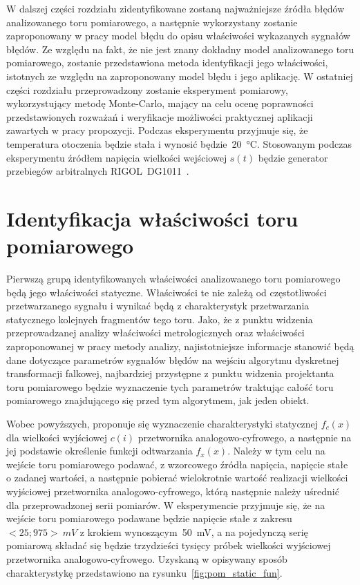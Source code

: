 W dalszej części rozdziału zidentyfikowane zostaną najważniejsze źródła błędów analizowanego toru pomiarowego, a następnie wykorzystany zostanie zaproponowany w pracy model błędu do opisu właściwości wykazanych sygnałów błędów. Ze względu na fakt, że nie jest znany dokładny model analizowanego toru pomiarowego, zostanie przedstawiona metoda identyfikacji jego właściwości, istotnych ze względu na zaproponowany model błędu i jego aplikację. W ostatniej części rozdziału przeprowadzony zostanie eksperyment pomiarowy, wykorzystujący metodę Monte-Carlo, mający na celu ocenę poprawności przedstawionych rozważań i weryfikacje możliwości praktycznej aplikacji zawartych w pracy propozycji. Podczas eksperymentu przyjmuje się, że temperatura otoczenia będzie stała i wynosić będzie~\qty{20}{\degreeCelsius}. Stosowanym podczas eksperymentu źródłem napięcia wielkości wejściowej $s(t)$ będzie generator przebiegów arbitralnych RIGOL~DG1011~\cite{rigol_manual}.

\section{Identyfikacja właściwości toru pomiarowego}

Pierwszą grupą identyfikowanych właściwości analizowanego toru pomiarowego będą jego właściwości statyczne. Właściwości te nie zależą od częstotliwości przetwarzanego sygnału i wynikać będą z charakterystyk przetwarzania statycznego kolejnych fragmentów tego toru. Jako, że z punktu widzenia przeprowadzanej analizy właściwości metrologicznych oraz właściwości zaproponowanej w pracy metody analizy, najistotniejsze informacje stanowić będą dane dotyczące parametrów sygnałów błędów na wejściu algorytmu dyskretnej transformacji falkowej, najbardziej przystępne z punktu widzenia projektanta toru pomiarowego będzie wyznaczenie tych parametrów traktując całość toru pomiarowego znajdującego się przed tym algorytmem, jak jeden obiekt.

Wobec powyższych, proponuje się wyznaczenie charakterystyki statycznej $f_{c}(x)$ dla wielkości wyjściowej $c(i)$ przetwornika analogowo-cyfrowego, a następnie na jej podstawie określenie funkcji odtwarzania $f_{x}(x)$. Należy w tym celu na wejście toru pomiarowego podawać, z wzorcowego źródła napięcia, napięcie stałe o zadanej wartości, a następnie pobierać wielokrotnie wartość realizacji wielkości wyjściowej przetwornika analogowo-cyfrowego, którą następnie należy uśrednić dla przeprowadzonej serii pomiarów. W eksperymencie przyjmuje się, że na wejście toru pomiarowego podawane będzie napięcie stałe z zakresu $<25;975>~\unit{mV}$ z krokiem wynoszącym~\qty{50}{mV}, a na pojedynczą serię pomiarową składać się będzie trzydzieści tysięcy próbek wielkości wyjściowej przetwornika analogowo-cyfrowego. Uzyskaną w opisywany sposób charakterystykę przedstawiono na rysunku~\ref{fig:pom_static_fun}.

